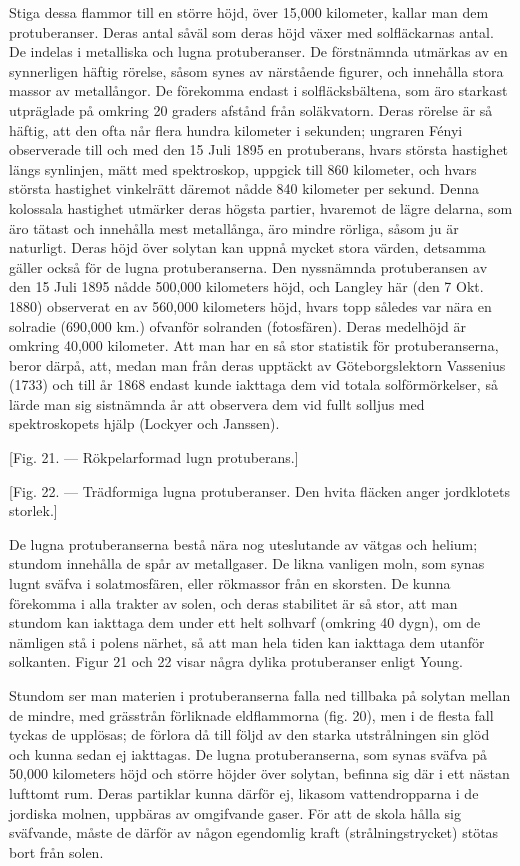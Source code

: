 \documentclass[a4paper, 12pt, oneside, swedish]{article}
\begin{document}
Stiga dessa flammor till en större höjd, över 15,000 kilometer, kallar man dem protuberanser. Deras antal såväl som deras höjd växer med solfläckarnas antal. De indelas i metalliska och lugna protuberanser. De förstnämnda utmärkas av en synnerligen häftig rörelse, såsom synes av närstående figurer, och innehålla stora massor av metallångor. De förekomma endast i solfläcksbältena, som äro starkast utpräglade på omkring 20 graders afstånd från soläkvatorn. Deras rörelse är så häftig, att den ofta når flera hundra kilometer i sekunden; ungraren Fényi observerade till och med den 15 Juli 1895 en protuberans, hvars största hastighet längs synlinjen, mätt med spektroskop, uppgick till 860 kilometer, och hvars största hastighet vinkelrätt däremot nådde 840 kilometer per sekund. Denna kolossala hastighet utmärker deras högsta partier, hvaremot de lägre delarna, som äro tätast och innehålla mest metallånga, äro mindre rörliga, såsom ju är naturligt. Deras höjd över solytan kan uppnå mycket stora värden, detsamma gäller också för de lugna protuberanserna. Den nyssnämnda protuberansen av den 15 Juli 1895 nådde 500,000 kilometers höjd, och Langley här (den 7 Okt. 1880) observerat en av 560,000 kilometers höjd, hvars topp således var nära en solradie (690,000 km.) ofvanför solranden (fotosfären). Deras medelhöjd är omkring 40,000 kilometer. Att man har en så stor statistik för protuberanserna, beror därpå, att, medan man från deras upptäckt av Göteborgslektorn Vassenius (1733) och till år 1868 endast kunde iakttaga dem vid totala solförmörkelser, så lärde man sig sistnämnda år att observera dem vid fullt solljus med spektroskopets hjälp (Lockyer och Janssen).

[Fig. 21. --- Rökpelarformad lugn protuberans.]

[Fig. 22. --- Trädformiga lugna protuberanser. Den hvita fläcken anger jordklotets storlek.]

De lugna protuberanserna bestå nära nog uteslutande av vätgas och helium; stundom innehålla de spår av metallgaser. De likna vanligen moln, som synas lugnt sväfva i solatmosfären, eller rökmassor från en skorsten. De kunna förekomma i alla trakter av solen, och deras stabilitet är så stor, att man stundom kan iakttaga dem under ett helt solhvarf (omkring 40 dygn), om de nämligen stå i polens närhet, så att man hela tiden kan iakttaga dem utanför solkanten. Figur 21 och 22 visar några dylika protuberanser enligt Young.

Stundom ser man materien i protuberanserna falla ned tillbaka på solytan mellan de mindre, med grässtrån förliknade eldflammorna (fig. 20), men i de flesta fall tyckas de upplösas; de förlora då till följd av den starka utstrålningen sin glöd och kunna sedan ej iakttagas. De lugna protuberanserna, som synas sväfva på 50,000 kilometers höjd och större höjder över solytan, befinna sig där i ett nästan lufttomt rum. Deras partiklar kunna därför ej, likasom vattendropparna i de jordiska molnen, uppbäras av omgifvande gaser. För att de skola hålla sig sväfvande, måste de därför av någon egendomlig kraft (strålningstrycket) stötas bort från solen.
\end{document}
